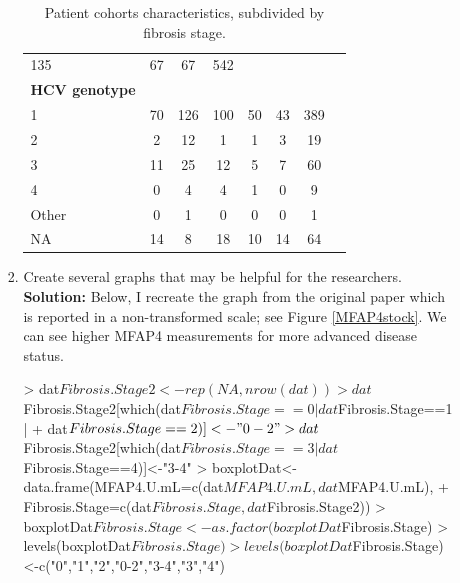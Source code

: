 \documentclass{article}
\begin{document}
\begin{enumerate}
\begin{enumerate}
\begin{enumerate}
\begin{table}[H]
\begin{tabular}{lccccccc}
                         135          & 67           &
                         67           & 542\\
    \textbf{HCV genotype}       &&&&&&\\
    1                  & 70           & 126          & 
                         100          & 50           &
                         43           & 389\\
    2                  & 2            & 12           & 
                         1            & 1            &
                         3            & 19\\
    3                  & 11           & 25           & 
                         12           & 5            &
                         7            & 60\\
    4                  & 0            & 4            & 
                         4            & 1            &
                         0            & 9\\
    Other              & 0            & 1            & 
                         0            & 0            &
                         0            & 1\\
    NA                 & 14           & 8            & 
                         18           & 10           &
                         14           & 64\\\hline
    \end{tabular}
    \caption{Patient cohorts characteristics, subdivided by fibrosis stage.}
  \end{table}
  \item Create several graphs that may be helpful for the researchers.\\
  \textbf{Solution:} Below, I recreate the graph from the original paper which is reported in a non-transformed
  scale; see Figure \ref{MFAP4stock}. We can see higher MFAP4 measurements for more advanced disease status.
\begin{Schunk}
\begin{Sinput}
> dat$Fibrosis.Stage2<-rep(NA,nrow(dat))
> dat$Fibrosis.Stage2[which(dat$Fibrosis.Stage==0 | dat$Fibrosis.Stage==1 | 
+                             dat$Fibrosis.Stage==2)]<-"0-2"
> dat$Fibrosis.Stage2[which(dat$Fibrosis.Stage==3 | dat$Fibrosis.Stage==4)]<-"3-4"
> boxplotDat<-data.frame(MFAP4.U.mL=c(dat$MFAP4.U.mL,dat$MFAP4.U.mL), 
+                        Fibrosis.Stage=c(dat$Fibrosis.Stage,dat$Fibrosis.Stage2))
> boxplotDat$Fibrosis.Stage<-as.factor(boxplotDat$Fibrosis.Stage)
> levels(boxplotDat$Fibrosis.Stage)
> levels(boxplotDat$Fibrosis.Stage)<-c("0","1","2","0-2","3-4","3","4")

\end{Sinput}
\end{Schunk}
\end{enumerate}
\end{enumerate}
\end{enumerate}
\end{document}
